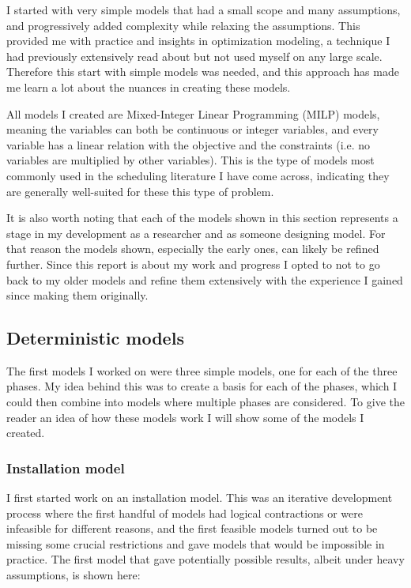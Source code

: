 \documentclass[a4paper,12pt]{article}
\begin{document}
I started with very simple models that had a small scope and many assumptions, and progressively added complexity while relaxing the assumptions. This provided me with practice and insights in optimization modeling, a technique I had previously extensively read about but not used myself on any large scale. Therefore this start with simple models was needed, and this approach has made me learn a lot about the nuances in creating these models. 

All models I created are Mixed-Integer Linear Programming (MILP) models, meaning the variables can both be continuous or integer variables, and every variable has a linear relation with the objective and the constraints (i.e. no variables are multiplied by other variables). This is the type of models most commonly used in the scheduling literature I have come across, indicating they are generally well-suited for these this type of problem. 

It is also worth noting that each of the models shown in this section represents a stage in my development as a researcher and as someone designing model. For that reason the models shown, especially the early ones, can likely be refined further. Since this report is about my work and progress I opted to not to go back to my older models and refine them extensively with the experience I gained since making them originally. 

\subsection{Deterministic models}
The first models I worked on were three simple models, one for each of the three phases. My idea behind this was to create a basis for each of the phases, which I could then combine into models where multiple phases are considered. To give the reader an idea of how these models work I will show some of the models I created.

\subsubsection{Installation model} \label{sss:install}
I first started work on an installation model. This was an iterative development process where the first handful of models had logical contractions or were infeasible for different reasons, and the first feasible models turned out to be missing some crucial restrictions and gave models that would be impossible in practice. The first model that gave potentially possible results, albeit under heavy assumptions, is shown here:
\end{document}
